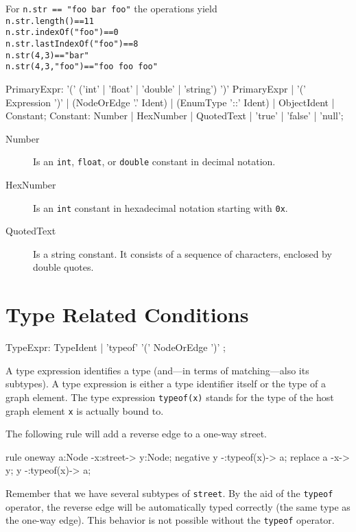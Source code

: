 \begin{example}
For \texttt{n.str == "foo bar foo"} the operations yield \\
\texttt{n.str.length()==11} \\
\texttt{n.str.indexOf("foo")==0} \\
\texttt{n.str.lastIndexOf("foo")==8} \\
\texttt{n.str(4,3)=="bar"} \\
\texttt{n.str(4,3,"foo")=="foo foo foo"} \\
\end{example}


\begin{rail} 
  PrimaryExpr: '(' ('int' | 'float' | 'double' | 'string') ')' PrimaryExpr | '(' Expression ')' | (NodeOrEdge '.' Ident) | (EnumType '::' Ident) | ObjectIdent | Constant;
  Constant: Number | HexNumber | QuotedText | 'true' | 'false' | 'null';
\end{rail}
\begin{description}
  \item[Number] Is an \texttt{int}, \texttt{float}, or \texttt{double} constant in decimal notation.
  \item[HexNumber] Is an \texttt{int} constant in hexadecimal notation starting with \texttt{0x}.
  \item[QuotedText] Is a string constant. It consists of a sequence of characters, enclosed by double quotes.
\end{description}

\section{Type Related Conditions}
\label{typeexpressions}

\begin{rail}
  TypeExpr: TypeIdent | 'typeof' '(' NodeOrEdge ')' ;
\end{rail}
A type expression identifies a type (and---in terms of matching---also its subtypes).
A type expression is either a type identifier itself or the type of a graph element.
The type expression \texttt{typeof(x)} stands for the type of the host graph element \texttt{x} is actually bound to.
\begin{example}
The following rule will add a reverse edge to a one-way street.
\begin{grgen}
rule oneway {
    a:Node -x:street-> y:Node;
    negative {
        y -:typeof(x)-> a;
    }
    replace {
        a -x-> y;
        y -:typeof(x)-> a;
    }
}
\end{grgen}
Remember that we have several subtypes of \texttt{street}. By the aid of the \texttt{typeof} operator, the reverse edge will be automatically typed correctly (the same type as the one-way edge). This behavior is not possible without the \texttt{typeof} operator.
\end{example}

